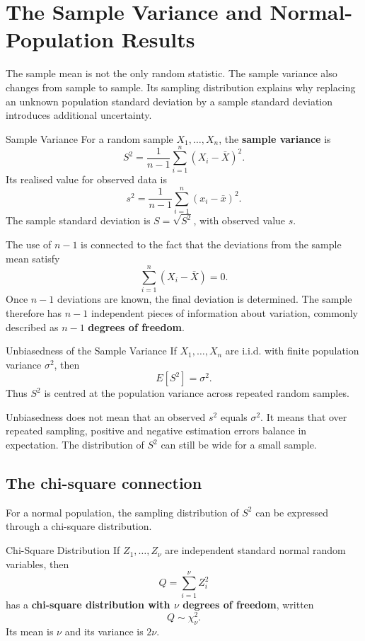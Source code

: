 \section{The Sample Variance and Normal-Population Results}
\label{sec:sample-variance-normal-results}

The sample mean is not the only random statistic. The sample variance also changes from sample to sample. Its sampling distribution explains why replacing an unknown population standard deviation by a sample standard deviation introduces additional uncertainty.

\begin{definition}{Sample Variance}
For a random sample $X_1,\ldots,X_n$, the \textbf{sample variance} is
\[
    S^2=\frac{1}{n-1}\sum_{i=1}^{n}(X_i-\bar X)^2.
\]
Its realised value for observed data is
\[
    s^2=\frac{1}{n-1}\sum_{i=1}^{n}(x_i-\bar x)^2.
\]
The sample standard deviation is $S=\sqrt{S^2}$, with observed value $s$.
\end{definition}

The use of $n-1$ is connected to the fact that the deviations from the sample mean satisfy
\[
    \sum_{i=1}^{n}(X_i-\bar X)=0.
\]
Once $n-1$ deviations are known, the final deviation is determined. The sample therefore has $n-1$ independent pieces of information about variation, commonly described as $n-1$ \textbf{degrees of freedom}.

\begin{theorem}{Unbiasedness of the Sample Variance}
If $X_1,\ldots,X_n$ are i.i.d. with finite population variance $\sigma^2$, then
\[
    E[S^2]=\sigma^2.
\]
Thus $S^2$ is centred at the population variance across repeated random samples.
\end{theorem}

Unbiasedness does not mean that an observed $s^2$ equals $\sigma^2$. It means that over repeated sampling, positive and negative estimation errors balance in expectation. The distribution of $S^2$ can still be wide for a small sample.

\subsection{The chi-square connection}
\label{sec:chi-square-sample-variance}

For a normal population, the sampling distribution of $S^2$ can be expressed through a chi-square distribution.

\begin{definition}{Chi-Square Distribution}
If $Z_1,\ldots,Z_\nu$ are independent standard normal random variables, then
\[
    Q=\sum_{i=1}^{\nu}Z_i^2
\]
has a \textbf{chi-square distribution with $\nu$ degrees of freedom}, written
\[
    Q\sim\chi^2_\nu.
\]
Its mean is $\nu$ and its variance is $2\nu$.
\end{definition}

